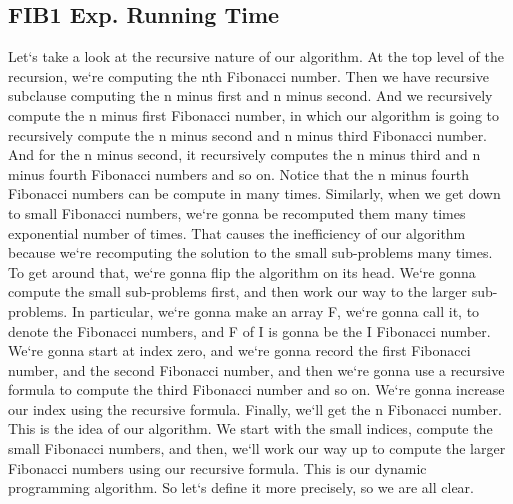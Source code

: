 \subsection{FIB1  Exp.
Running Time}
Let`s take a look at the recursive nature of our algorithm.
At the top level of the recursion, we`re computing the nth Fibonacci number.
Then we have recursive subclause computing the n minus first and n minus second.
And we recursively compute the n minus first Fibonacci number, in which our algorithm is going to recursively compute the n minus second and n minus third Fibonacci number.
And for the n minus second, it recursively computes the n minus third and n minus fourth Fibonacci numbers and so on.
Notice that the n minus fourth Fibonacci numbers can be compute in many times.
Similarly, when we get down to small Fibonacci numbers, we`re gonna be recomputed them many times exponential number of times.
That causes the inefficiency of our algorithm because we`re recomputing the solution to the small sub-problems many times.
To get around that, we`re gonna flip the algorithm on its head.
We`re gonna compute the small sub-problems first, and then work our way to the larger sub-problems.
In particular, we`re gonna make an array F, we`re gonna call it, to denote the Fibonacci numbers, and F of I is gonna be the I Fibonacci number.
We`re gonna start at index zero, and we`re gonna record the first Fibonacci number, and the second Fibonacci number, and then we`re gonna use a recursive formula to compute the third Fibonacci number and so on.
We`re gonna increase our index using the recursive formula.
Finally, we`ll get the n Fibonacci number.
This is the idea of our algorithm.
We start with the small indices, compute the small Fibonacci numbers, and then, we`ll work our way up to compute the larger Fibonacci numbers using our recursive formula.
This is our dynamic programming algorithm.
So let`s define it more precisely, so we are all clear.

